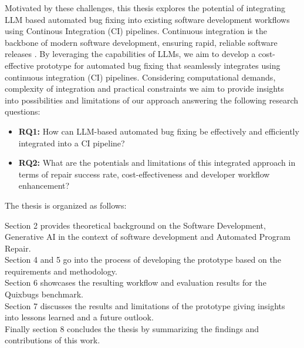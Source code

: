 Motivated by these challenges, this thesis explores the potential of integrating LLM based automated bug fixing into existing software development workflows using Continous Integration (CI) pipelines. Continuous integration is the backbone of modern software development, ensuring rapid, reliable software releases \cite{ugwuezeContinuousIntegrationDeployment2024}. By leveraging the capabilities of LLMs, we aim to develop a cost-effective prototype for automated bug fixing that seamlessly integrates using continuous integration (CI) pipelines. Considering computational demands, complexity of integration and practical constraints we aim to provide insights into possibilities and limitations of our approach answering the following research questions:

\begin{itemize}
    \item \textbf{RQ1:} How can LLM-based automated bug fixing be effectively and efficiently integrated into a CI pipeline?
    \item \textbf{RQ2:} What are the potentials and limitations of this integrated approach in terms of repair success rate, cost-effectiveness and developer workflow enhancement?
\end{itemize}


The thesis is organized as follows:

Section 2 provides theoretical background on the Software Development, Generative AI in the context of software development and Automated Program Repair.\\
Section 4 and 5 go into the process of developing the prototype based on the requirements and methodology.\\
Section 6 showcases the resulting workflow and evaluation results for the Quixbugs benchmark.\\
Section 7 discusses the results and limitations of the prototype giving insights into lessons learned and a future outlook.\\
Finally section 8 concludes the thesis by summarizing the findings and contributions of this work.